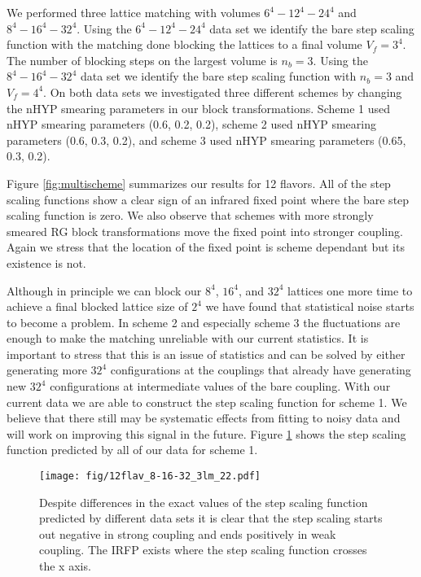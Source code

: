 \documentclass{PoS}
\begin{document}
We performed three lattice matching \cite{} with volumes $6^4-12^4-24^4$ and $8^4-16^4-32^4$.
Using the $6^4-12^4-24^4$ data set we identify the bare step scaling function with the matching done blocking the lattices to a final volume $V_f=3^4$.
The number of blocking steps on the largest volume is $n_b=3$.
Using the $8^4-16^4-32^4$ data set we identify the bare step scaling function with $n_b=3$ and $V_f=4^4$.
On both data sets we investigated three different schemes by changing the nHYP smearing parameters in our block transformations.
Scheme 1 used nHYP smearing parameters (0.6, 0.2, 0.2), scheme 2 used nHYP smearing parameters (0.6, 0.3, 0.2), and scheme 3 used nHYP smearing parameters (0.65, 0.3, 0.2).

Figure \ref{fig:multischeme} summarizes our results for 12 flavors.
All of the step scaling functions show a clear sign of an infrared fixed point where the bare step scaling function is zero.
We also observe that schemes with more strongly smeared RG block transformations move the fixed point into stronger coupling.
Again we stress that the location of the fixed point is scheme dependant but its existence is not.

Although in principle we can block our  $8^4$, $16^4$, and $32^4$ lattices one more time to achieve a final blocked lattice size of $2^4$ we have found that statistical noise starts to become a problem.
In scheme 2 and especially scheme 3 the fluctuations are enough to make the matching unreliable with our current statistics.
It is important to stress that this is an issue of statistics and can be solved by either generating more $32^4$ configurations at the couplings that already have generating new $32^4$ configurations at intermediate values of the bare coupling.
With our current data we are able to construct the step scaling function for scheme 1.
We believe that there still may be systematic effects from fitting to noisy data and will work on improving this signal in the future.
Figure \ref{fig:scheme7} shows the step scaling function predicted by all of our data for scheme 1.

\begin{figure}[th]
  \centering
  \texttt{[image: fig/12flav\_8-16-32\_3lm\_22.pdf]}
  \caption{Despite differences in the exact values of the step scaling function predicted by different data sets it is clear that the step scaling starts out negative in strong coupling and ends positively in weak coupling.  The IRFP exists where the step scaling function crosses the x axis.}
  \label{fig:scheme7}
\end{figure}
\end{document}
